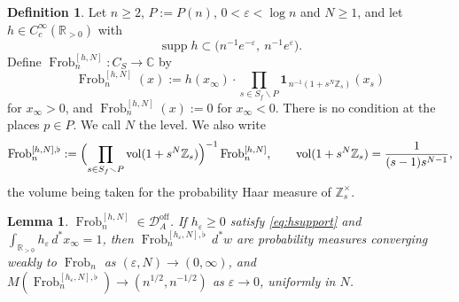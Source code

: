 \documentclass[11pt]{amsart}
\newtheorem{lemma}[theorem]{Lemma}
\theoremstyle{definition}
\newtheorem{definition}[theorem]{Definition}
\newcommand{\C}{\mathbb C}
\newcommand{\R}{\mathbb R}
\newcommand{\Z}{\mathbb Z}
\newcommand{\Frob}{\operatorname{Frob}}
\newcommand{\supp}{\operatorname{supp}}
\newcommand{\vol}{\operatorname{vol}}
\newcommand{\Doff}{\mathcal D_A^{\mathrm{off}}}
\begin{document}
\begin{definition}\label{def:smearedfrob}
Let $n\ge2$, $P:=P(n)$, $0<\varepsilon<\log n$ and $N\ge1$, and let
$h\in C_c^\infty(\R_{>0})$ with
\begin{equation}\label{eq:hsupport}
  \supp h\subset\bigl(n^{-1}e^{-\varepsilon},\ n^{-1}e^{\varepsilon}\bigr).
\end{equation}
Define $\Frob_n^{[h,N]}:C_S\to\C$ by
\begin{equation}\label{eq:smearedfrob}
  \Frob_n^{[h,N]}(x):=h(x_\infty)\cdot\prod_{s\in S_f\smallsetminus P}
   \mathbf 1_{\,n^{-1}(1+s^N\Z_s)}(x_s)
\end{equation}
for $x_\infty>0$, and $\Frob_n^{[h,N]}(x):=0$ for $x_\infty<0$. There is no
condition at the places $p\in P$. We call $N$ the level. We also write
\[
  \Frob_n^{[h,N],\flat}:=\Bigl(\prod_{s\in S_f\smallsetminus P}
  \vol(1+s^N\Z_s)\Bigr)^{-1}\Frob_n^{[h,N]},\qquad
  \vol(1+s^N\Z_s)=\frac1{(s-1)s^{N-1}},
\]
the volume being taken for the probability Haar measure of $\Z_s^\times$.
\end{definition}

\begin{lemma}\label{lem:smearedfrobinDA}
$\Frob_n^{[h,N]}\in\Doff$. If $h_\varepsilon\ge0$ satisfy
\eqref{eq:hsupport} and $\int_{\R_{>0}}h_\varepsilon\,d^*x_\infty=1$, then
$\Frob_n^{[h_\varepsilon,N],\flat}\,d^*w$ are probability measures converging
weakly to $\Frob_n$ as $(\varepsilon,N)\to(0,\infty)$, and
$M(\Frob_n^{[h_\varepsilon,N],\flat})\to(n^{1/2},n^{-1/2})$ as
$\varepsilon\to0$, uniformly in $N$.
\end{lemma}
\end{document}
